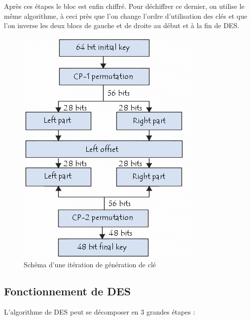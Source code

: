 \documentclass[a4paper,12pt]{article}
\begin{document}
Après ces étapes le bloc est enfin chiffré. Pour déchiffrer ce dernier, on utilise le même algorithme, à ceci près que l'on change l'ordre d'utilisation des clés et que l'on inverse les deux blocs de gauche et de droite au début et à la fin de DES.

\begin{figure}[h]
\centering
\includegraphics[scale=0.80]{./images/keygen.png}
\caption{Schéma d'une itération de génération de clé}
\label{fig:keygen}
\end{figure}

\clearpage

\subsection{Fonctionnement de DES}	

L'algorithme de DES peut se décomposer en 3 grandes étapes :
\end{document}
